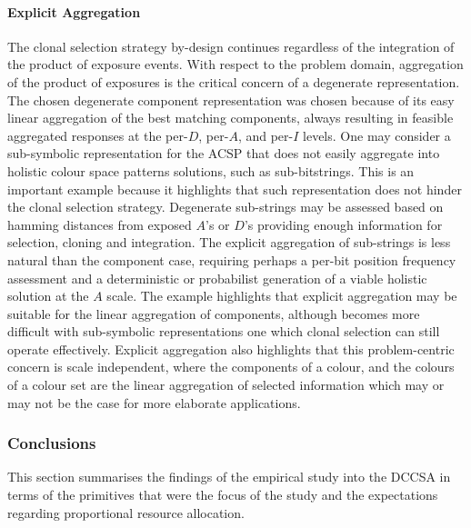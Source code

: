 \paragraph{Explicit Aggregation}
The clonal selection strategy by-design continues regardless of the integration of the product of exposure events. With respect to the problem domain, aggregation of the product of exposures is the critical concern of a degenerate representation. The chosen degenerate component representation was chosen because of its easy linear aggregation of the best matching components, always resulting in feasible aggregated responses at the per-$D$, per-$A$, and per-$I$ levels.
One may consider a sub-symbolic representation for the ACSP that does not easily aggregate into holistic colour space patterns solutions, such as sub-bitstrings. This is an important example because it highlights that such representation does not hinder the clonal selection strategy. Degenerate sub-strings may be assessed based on hamming distances from exposed $A$'s or $D$'s providing enough information for selection, cloning and integration. The explicit aggregation of sub-strings is less natural than the component case, requiring perhaps a per-bit position frequency assessment and a deterministic or probabilist generation of a viable holistic solution at the $A$ scale. The example highlights that explicit aggregation may be suitable for the linear aggregation of components, although becomes more difficult with sub-symbolic representations one which clonal selection can still operate effectively. 
Explicit aggregation also highlights that this problem-centric concern is scale independent, where the components of a colour, and the colours of a colour set are the linear aggregation of selected information which may or may not be the case for more elaborate applications.

%
%
\subsubsection{Conclusions}
This section summarises the findings of the empirical study into the DCCSA in terms of the primitives that were the focus of the study and the expectations regarding proportional resource allocation.

